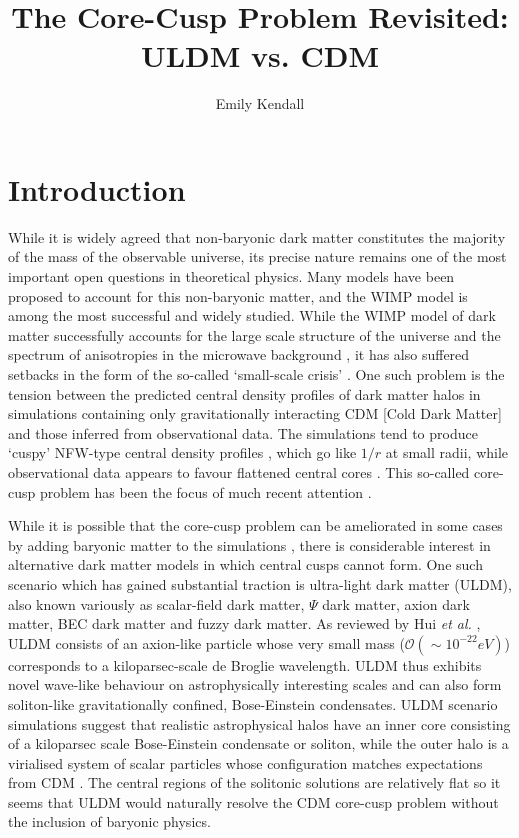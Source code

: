 \documentclass[a4paper,11pt]{article}
\title{\boldmath The Core-Cusp Problem Revisited: ULDM vs. CDM}
\author[1]{Emily Kendall}
\affiliation[1]{Department of Physics, University of Auckland, Private Bag 92019, Auckland, New Zealand}
\begin{document}
\maketitle
\flushbottom


\section{Introduction}\label{sec:intro}

While it is widely agreed that non-baryonic dark matter constitutes the majority of the mass of the observable universe, its precise nature remains one of the most important open questions in theoretical physics. Many models have been proposed to account for this non-baryonic matter, and the WIMP model is among the most successful and widely studied. While the WIMP model of dark matter successfully accounts for the large scale structure of the universe \cite{Springel:2005nw} and the spectrum of anisotropies in the microwave background \cite{deBernardis:2000sbo, Hanany:2000qf, Halverson:2001yy, Netterfield:2001yq, Lee:2001yp, Ade:2015xua,  Hu:2001bc}, it has also suffered setbacks in the form of the so-called `small-scale crisis' \cite{Weinberg:2013aya}. One such problem is the tension between the predicted central density profiles of dark matter halos in simulations containing only gravitationally interacting CDM [Cold Dark Matter] and those inferred from observational data. The simulations tend to produce `cuspy' NFW-type central density profiles \cite{Navarro:1995iw}, which go like $1/r$ at small radii, while observational data appears to favour flattened central cores \cite{Moore:1994yx} . This so-called core-cusp problem has been the focus of much recent attention \cite{Dutton:2018nop, Read:2018pft, Genina:2018}. 

While it is possible that the core-cusp problem can be ameliorated in some cases by adding baryonic matter to the simulations  \cite{Benitez-Llambay:2018}, there is considerable interest in alternative dark matter models in which central cusps cannot form.  One such scenario which has gained substantial traction is ultra-light dark matter (ULDM), also known variously as scalar-field dark matter, $\Psi$ dark matter, axion dark matter, BEC dark matter and fuzzy dark matter. As reviewed by Hui {\em et al.\/} \cite{Hui:2016ltb}, ULDM consists of an axion-like particle whose very small mass  ($\mathcal{O}(\sim 10^{-22}eV)$) corresponds to a kiloparsec-scale de Broglie wavelength.  ULDM thus exhibits novel wave-like behaviour on astrophysically interesting scales and can also form soliton-like gravitationally confined, Bose-Einstein condensates. ULDM scenario simulations suggest that realistic astrophysical halos have an inner core consisting of a kiloparsec scale Bose-Einstein condensate or soliton, while the outer halo is a virialised system of scalar particles whose configuration matches expectations from CDM \cite{Schwabe:2016rze, Veltmaat:2018dfz}. The central regions of the solitonic solutions are relatively flat so it seems that ULDM would naturally resolve the CDM core-cusp problem without the inclusion of baryonic physics. 
\end{document}

